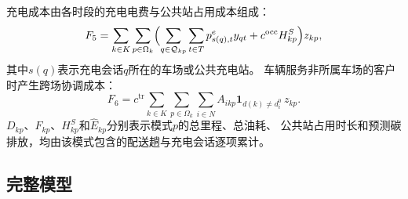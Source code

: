 \documentclass{setp-new}
\begin{document}
充电成本由各时段的充电电费与公共站占用成本组成：
\begin{equation}
F_5=\sum_{k\in K}\sum_{p\in\Omega_k}\Bigl(\sum_{q\in\mathcal Q_{kp}}\sum_{t\in T}p_{s(q),t}^{e}y_{qt}
+c^{\mathrm{occ}}H_{kp}^{S}\Bigr)z_{kp},
\label{eq:F5}
\end{equation}
其中$s(q)$表示充电会话$q$所在的车场或公共充电站。
车辆服务非所属车场的客户时产生跨场协调成本：
\begin{equation}
F_6=c^{\mathrm{tr}}\sum_{k\in K}\sum_{p\in\Omega_k}\sum_{i\in N}A_{ikp}\mathbf 1_{d(k)\neq d_i^0}\,z_{kp}.
\label{eq:F6}
\end{equation}
$D_{kp}$、$F_{kp}$、$H_{kp}^{S}$和$\widehat E_{kp}$分别表示模式$p$的总里程、总油耗、
公共站占用时长和预测碳排放，均由该模式包含的配送趟与充电会话逐项累计。

\subsection{完整模型}
\end{document}
